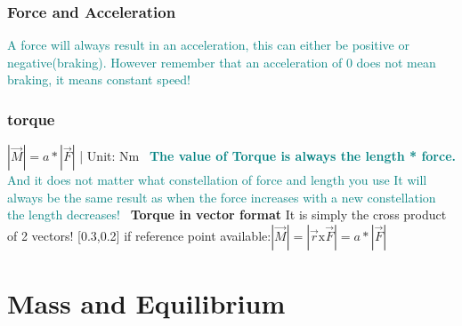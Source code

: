 \documentclass[main.tex,fontsize=8pt,paper=a4,paper=portrait,DIV=calc,]{scrartcl}
\begin{document}
\begin{multicols*}{2}
\subsubsection{Force and Acceleration} 
\textcolor{teal}{A force will always result in an acceleration, this can either be positive or negative(braking).\newline
However remember that an acceleration of 0 does not mean braking, it means constant speed!}

\subsubsection{torque}
\Large \( |\vec{M}| = a * |\vec{F}| \) | Unit: Nm\newline
\, \newline
\textcolor{teal}{ \normalsize \textbf{The value of Torque is always the length * force.}\newline
And it does not matter what constellation of force and length you use\newline
It will always be the same result as when the force increases with a new constellation the length decreases!}\newline
\, \newline
\textbf{Torque in vector format}\newline
It is simply the cross product of 2 vectors!\newline
{}\newline
{}
{}[0.3,0.2]
\Large if reference point available:\newline \( |\vec{M}| = | \vec{r} \text{x} \vec{F} | = a * | \vec{F} | \ \)

\section{Mass and Equilibrium}


\end{multicols*}
\end{document}

